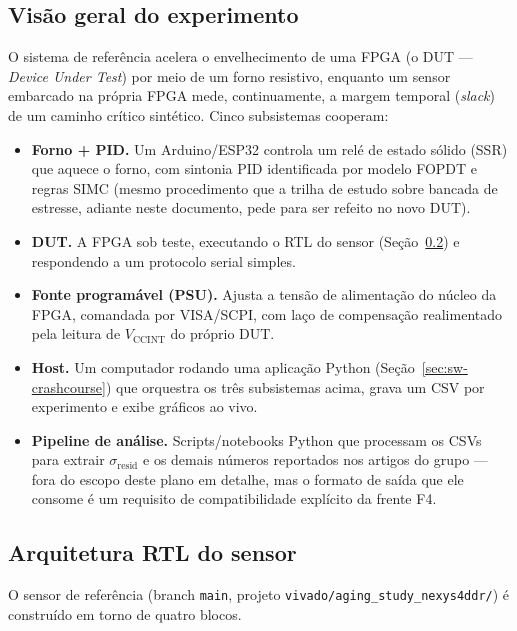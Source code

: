 \documentclass[11pt,a4paper]{article}
\begin{document}
\subsection{Visão geral do experimento}

O sistema de referência acelera o envelhecimento de uma FPGA (o DUT --- \emph{Device
Under Test}) por meio de um forno resistivo, enquanto um sensor embarcado na própria
FPGA mede, continuamente, a margem temporal (\emph{slack}) de um caminho crítico
sintético. Cinco subsistemas cooperam:

\begin{itemize}
  \item \textbf{Forno + PID.} Um Arduino/ESP32 controla um relé de estado sólido
        (SSR) que aquece o forno, com sintonia PID identificada por modelo FOPDT e
        regras SIMC (mesmo procedimento que a trilha de estudo sobre bancada de
        estresse, adiante neste documento, pede para ser refeito no novo DUT).
  \item \textbf{DUT.} A FPGA sob teste, executando o RTL do sensor (Seção~\ref{sec:rtl-crashcourse})
        e respondendo a um protocolo serial simples.
  \item \textbf{Fonte programável (PSU).} Ajusta a tensão de alimentação do núcleo
        da FPGA, comandada por VISA/SCPI, com laço de compensação realimentado pela
        leitura de $V_\text{CCINT}$ do próprio DUT.
  \item \textbf{Host.} Um computador rodando uma aplicação Python (Seção~\ref{sec:sw-crashcourse})
        que orquestra os três subsistemas acima, grava um CSV por experimento e
        exibe gráficos ao vivo.
  \item \textbf{Pipeline de análise.} Scripts/notebooks Python que processam os CSVs
        para extrair $\sigma_\text{resid}$ e os demais números reportados nos artigos
        do grupo --- fora do escopo deste plano em detalhe, mas o formato de saída
        que ele consome é um requisito de compatibilidade explícito da frente F4.
\end{itemize}

\subsection{Arquitetura RTL do sensor}
\label{sec:rtl-crashcourse}

O sensor de referência (branch \texttt{main}, projeto
\texttt{vivado/aging\_study\_nexys4ddr/}) é construído em torno de quatro blocos.
\end{document}
